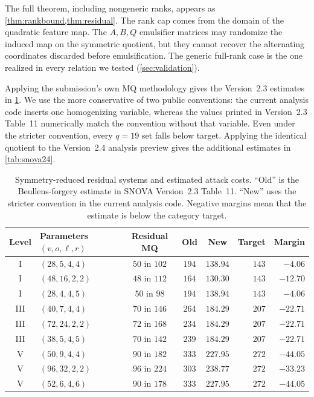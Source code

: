 \documentclass[runningheads]{llncs}
\newcommand{\SNOVA}{\textsf{SNOVA}}
\begin{document}
The full theorem, including nongeneric ranks, appears as \cref{thm:rankbound,thm:residual}.  The rank cap comes from the domain of the quadratic feature map.  The $A,B,Q$ emulsifier matrices may randomize the induced map on the symmetric quotient, but they cannot recover the alternating coordinates discarded before emulsification.  The generic full-rank case is the one realized in every relation we tested (\cref{sec:validation}).

Applying the submission's own MQ methodology gives the Version~2.3 estimates in \cref{tab:main}.  We use the more conservative of two public conventions: the current analysis code inserts one homogenizing variable, whereas the values printed in Version~2.3 Table~11 numerically match the convention without that variable.  Even under the stricter convention, every $q=19$ set falls below target.  Applying the identical quotient to the Version~2.4 analysis preview gives the additional estimates in \cref{tab:snova24}.

\begin{table}[t]
\centering
\caption{Symmetry-reduced residual systems and estimated attack costs.  ``Old'' is the Beullens-forgery estimate in \SNOVA{} Version~2.3 Table~11.  ``New'' uses the stricter convention in the current analysis code.  Negative margins mean that the estimate is below the category target.}\label{tab:main}
\small
\setlength{\tabcolsep}{4.2pt}
\begin{tabular}{@{}c l c c c r r@{}}
\toprule
Level & Parameters $(v,o,\ell,r)$ & Residual MQ & Old & New & Target & Margin\\
\midrule
I   & $(28,5,4,4)$   & $50$ in $102$ & $194$ & $138.94$ & $143$ & $-4.06$\\
I   & $(48,16,2,2)$  & $48$ in $112$ & $164$ & $130.30$ & $143$ & $-12.70$\\
I   & $(28,4,4,5)$   & $50$ in $98$  & $194$ & $138.94$ & $143$ & $-4.06$\\
\midrule
III & $(40,7,4,4)$   & $70$ in $146$ & $264$ & $184.29$ & $207$ & $-22.71$\\
III & $(72,24,2,2)$  & $72$ in $168$ & $234$ & $184.29$ & $207$ & $-22.71$\\
III & $(38,5,4,5)$   & $70$ in $142$ & $239$ & $184.29$ & $207$ & $-22.71$\\
\midrule
V   & $(50,9,4,4)$   & $90$ in $182$ & $333$ & $227.95$ & $272$ & $-44.05$\\
V   & $(96,32,2,2)$  & $96$ in $224$ & $303$ & $238.77$ & $272$ & $-33.23$\\
V   & $(52,6,4,6)$   & $90$ in $178$ & $333$ & $227.95$ & $272$ & $-44.05$\\
\bottomrule
\end{tabular}
\end{table}
\end{document}
